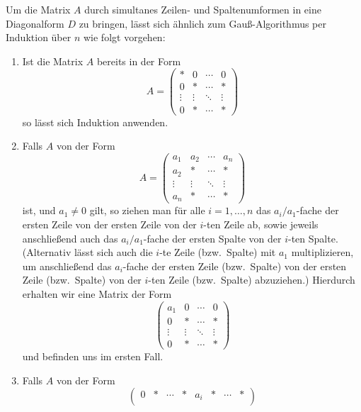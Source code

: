 Um die Matrix $A$ durch simultanes Zeilen- und Spaltenumformen in eine Diagonalform $D$ zu bringen, lässt sich ähnlich zum Gauß-Algorithmus per Induktion über $n$ wie folgt vorgehen:
\begin{enumerate}
  \item 
    Ist die Matrix $A$ bereits in der Form
    \[
        A
      = \begin{pmatrix}
          *       & 0       & \cdots  & 0       \\
          0       & *       & \cdots  & *       \\
          \vdots  & \vdots  & \ddots  & \vdots  \\
          0       & *       & \cdots  & *
        \end{pmatrix}
    \]
    so lässt sich Induktion anwenden.
  \item
    Falls $A$ von der Form
    \[
        A
      = \begin{pmatrix}
          a_1     & a_2     & \cdots  & a_n     \\
          a_2     & *       & \cdots  & *       \\
          \vdots  & \vdots  & \ddots  & \vdots  \\
          a_n     & *       & \cdots  & *
        \end{pmatrix}
    \]
    ist, und $a_1 \neq 0$ gilt, so ziehen man für alle $i = 1, \dotsc, n$ das $a_i/a_1$-fache der ersten Zeile von der ersten Zeile von der $i$-ten Zeile ab, sowie jeweils anschließend auch das $a_i/a_1$-fache der ersten Spalte von der $i$-ten Spalte.
    (Alternativ lässt sich auch die $i$-te Zeile (bzw.\ Spalte) mit $a_1$ multiplizieren, um anschließend das $a_i$-fache der ersten Zeile (bzw.\ Spalte) von der ersten Zeile (bzw.\ Spalte) von der $i$-ten Zeile (bzw.\ Spalte) abzuziehen.)
    Hierdurch erhalten wir eine Matrix der Form
    \[
      \begin{pmatrix}
        a_1     & 0       & \cdots  & 0       \\
        0       & *       & \cdots  & *       \\
        \vdots  & \vdots  & \ddots  & \vdots  \\
        0       & *       & \cdots  & *
      \end{pmatrix}
    \]
    und befinden uns im ersten Fall.
  \item
    Falls $A$ von der Form
    \[
      \begin{pmatrix}
        0       & *       & \cdots  & *       & a_i     & *       & \cdots  & *       \\

\end{pmatrix}\]
\end{enumerate}
